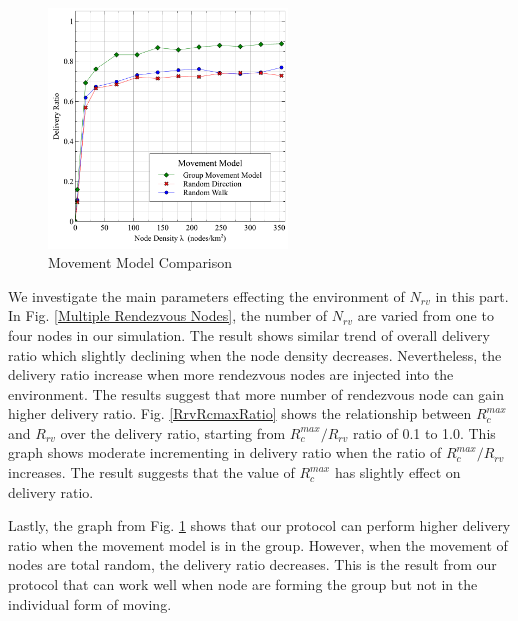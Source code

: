\documentclass[conference]{IEEEtran}
\begin{document}
\begin{figure}[!t]
\centering
\includegraphics[width=2.5in]{Graphs/movement.pdf}
\caption{Movement Model Comparison}
\label{Movement Model Comparison}
\end{figure}

We investigate the main parameters effecting the environment of $N_{rv}$ in this part.
In Fig. \ref{Multiple Rendezvous Nodes}, the number of $N_{rv}$ are varied from one to four nodes in our simulation.
The result shows similar trend of overall delivery ratio which slightly declining when the node density decreases.
Nevertheless, the delivery ratio increase when more rendezvous nodes are injected into the environment.
The results suggest that more number of rendezvous node can gain higher delivery ratio.
Fig. \ref{RrvRcmaxRatio} shows the relationship between $R_c^{max}$ and $R_{rv}$ over the delivery ratio, starting from  $R_c^{max}/R_{rv}$ ratio of 0.1 to 1.0.
This graph shows moderate incrementing in delivery ratio when the ratio of $R_c^{max}/R_{rv}$ increases.
The result suggests that the value of $R_c^{max}$ has slightly effect on delivery ratio. 

Lastly, the graph from Fig. \ref{Movement Model Comparison} shows that our protocol can perform higher delivery ratio when the movement model is in the group.
However, when the movement of nodes are total random, the delivery ratio decreases.
This is the result from our protocol that can work well when node are forming the group but not in the individual form of moving.

\end{document}
